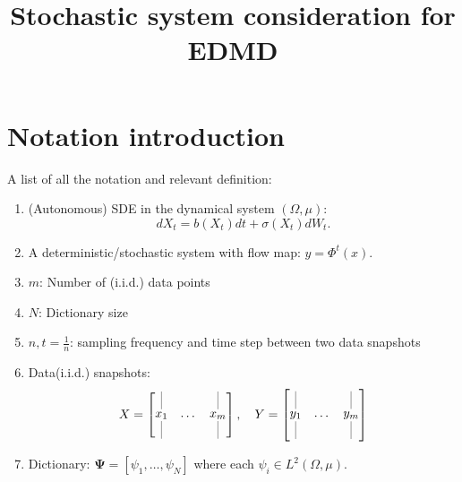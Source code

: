 \documentclass{article}[11]
\title{Stochastic system consideration for EDMD}
\begin{document}
	
	\maketitle
	
	\section{Notation introduction}
	A list of all the notation and relevant definition:
	\begin{enumerate}
		\item (Autonomous) SDE in the dynamical system $(\Omega, \mu)$:
		$$dX_t = b(X_t)dt + \sigma(X_t)dW_t.$$
		
		\item A deterministic/stochastic system with flow map: $y=\Phi^{t}(x)$.
		
		\item $m$: Number of (i.i.d.) data points
		
		\item $N$: Dictionary size
		
		\item $n,t=\frac{1}{n}$: sampling frequency and time step between two data snapshots
		
		\item Data(i.i.d.) snapshots:
		\[
		X = \begin{bmatrix} 
			\underset{\rule{0.1mm}{5mm}}{\overset{\rule{0.1mm}{5mm}}{x_1}} & \dots & \underset{\rule{0.1mm}{5mm}}{\overset{\rule{0.1mm}{5mm}}{x_m}}
		\end{bmatrix}
		, \quad
		Y = \begin{bmatrix} 
			\underset{\rule{0.1mm}{5mm}}{\overset{\rule{0.1mm}{5mm}}{y_1}} & \dots & \underset{\rule{0.1mm}{5mm}}{\overset{\rule{0.1mm}{5mm}}{y_m}}
		\end{bmatrix}
		\]
		
		\item Dictionary: $\mathbf{\Psi} = \left[ \psi_1, \dots, \psi_N \right]$ where each $\psi_i \in L^2(\Omega, \mu)$.
		

\end{enumerate}
\end{document}
